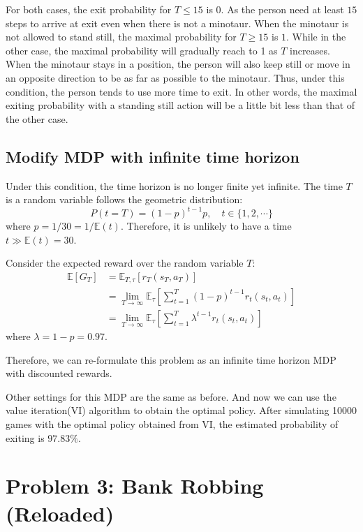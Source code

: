 \documentclass{article}
\begin{document}
For both cases, the exit probability for $T\leq 15$ is $0$. As the person need at least $15$ steps to arrive at exit even when there is not a minotaur.
When the minotaur is not allowed to stand still, the maximal probability for $T\geq 15$ is $1$. While in the other case, the maximal probability will gradually reach to 1 as $T$ increases.
When the minotaur stays in a position, the person will also keep still or move in an opposite direction to be as far as possible to the minotaur.
Thus, under this condition, the person tends to use more time to exit.
In other words, the maximal exiting probability with a standing still action will be a little bit less than that of the other case.

\subsection{Modify MDP with infinite time horizon}
Under this condition, the time horizon is no longer finite yet infinite.
The time $T$ is a random variable follows the geometric distribution:
\begin{equation*}
  P(t=T) = (1-p)^{t-1} p, \quad t \in \{1,2,\cdots\}
\end{equation*}
where $p=1 / 30 = 1 / \mathbb{E}(t)$. Therefore, it is unlikely to have a time $t \gg \mathbb{E}(t) = 30$.

Consider the expected reward over the random variable $T$:
\begin{align*}
  \mathbb{E}[G_{T}]
    &= \mathbb{E}_{T, \tau}[r_T(s_T, a_T)] \\
    &= \lim_{T\rightarrow\infty} \mathbb{E}_{\tau}\left[\sum_{t=1}^{T} (1-p)^{t-1} r_t(s_t, a_t)\right] \\
    &= \lim_{T\rightarrow\infty} \mathbb{E}_{\tau}\left[\sum_{t=1}^{T} \lambda^{t-1} r_t(s_t, a_t)\right]
\end{align*}
where $\lambda = 1- p = 0.97$.

Therefore, we can re-formulate this problem as an infinite time horizon MDP with discounted rewards.

Other settings for this MDP are the same as before. And now we can use the value iteration(VI) algorithm to obtain the optimal policy.
After simulating 10000 games with the optimal policy obtained from VI, the estimated probability of exiting is $97.83\%$.

\section{Problem 3: Bank Robbing (Reloaded)}
\end{document}

